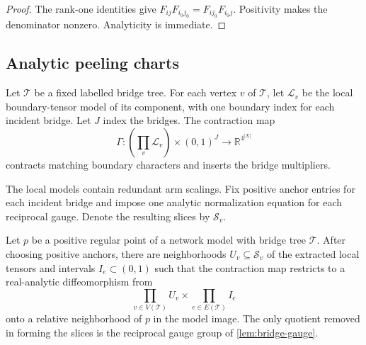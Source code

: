 \begin{proof}
The rank-one identities give $F_{ij}F_{i_0j_0}=F_{ij_0}F_{i_0j}$.  Positivity makes the denominator nonzero.  Analyticity is immediate.
\end{proof}

\subsection{Analytic peeling charts}

Let $\mathcal T$ be a fixed labelled bridge tree.  For each vertex $v$ of $\mathcal T$, let $\mathcal L_v$ be the local boundary-tensor model of its component, with one boundary index for each incident bridge.  Let $J$ index the bridges.  The contraction map
\[
\Gamma:\left(\prod_v\mathcal L_v\right)\times(0,1)^J\longrightarrow\mathbb R^{4^{|X|}}
\]
contracts matching boundary characters and inserts the bridge multipliers.

The local models contain redundant arm scalings.  Fix positive anchor entries for each incident bridge and impose one analytic normalization equation for each reciprocal gauge.  Denote the resulting slices by $\mathcal S_v$.

\begin{theorem}\label{thm:peeling-chart}
Let $p$ be a positive regular point of a network model with bridge tree $\mathcal T$.  After choosing positive anchors, there are neighborhoods $U_v\subseteq\mathcal S_v$ of the extracted local tensors and intervals $I_e\subset(0,1)$ such that the contraction map restricts to a real-analytic diffeomorphism from
\begin{equation}\label{eq:product-chart}
\prod_{v\in V(\mathcal T)}U_v\times\prod_{e\in E(\mathcal T)} I_e
\end{equation}
onto a relative neighborhood of $p$ in the model image.  The only quotient removed in forming the slices is the reciprocal gauge group of \cref{lem:bridge-gauge}.
\end{theorem}

